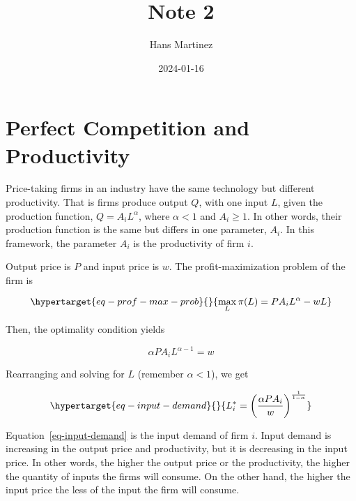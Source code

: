 \documentclass[
]{article}
\title{Note 2}
\author{Hans Martinez}
\date{2024-01-16}
\begin{document}
\maketitle
\ifdefined\Shaded\renewenvironment{Shaded}{\begin{tcolorbox}[borderline west={3pt}{0pt}{shadecolor}, interior hidden, enhanced, frame hidden, breakable, sharp corners, boxrule=0pt]}{\end{tcolorbox}}\fi

\hypertarget{perfect-competition-and-productivity}{%
\section{Perfect Competition and
Productivity}\label{perfect-competition-and-productivity}}

Price-taking firms in an industry have the same technology but different
productivity. That is firms produce output \(Q\), with one input \(L\),
given the production function, \(Q=A_i L^{\alpha}\), where \(\alpha<1\)
and \(A_i\ge1\). In other words, their production function is the same
but differs in one parameter, \(A_i\). In this framework, the parameter
\(A_i\) is the productivity of firm \(i\).

Output price is \(P\) and input price is \(w\). The profit-maximization
problem of the firm is

\begin{equation}\protect\hypertarget{eq-prof-max-prob}{}{
\max_{L} \pi(L) = PA_i L^{\alpha}-wL
}\label{eq-prof-max-prob}\end{equation}

Then, the optimality condition yields

\[
\alpha P A_i L^{\alpha-1} = w
\]

Rearranging and solving for \(L\) (remember \(\alpha<1\)), we get

\begin{equation}\protect\hypertarget{eq-input-demand}{}{
L_i^*=\left(\frac{\alpha P A_i}{w}\right)^{\frac{1}{1-\alpha}}
}\label{eq-input-demand}\end{equation}

Equation~\ref{eq-input-demand} is the input demand of firm \(i\). Input
demand is increasing in the output price and productivity, but it is
decreasing in the input price. In other words, the higher the output
price or the productivity, the higher the quantity of inputs the firms
will consume. On the other hand, the higher the input price the less of
the input the firm will consume.
\end{document}
